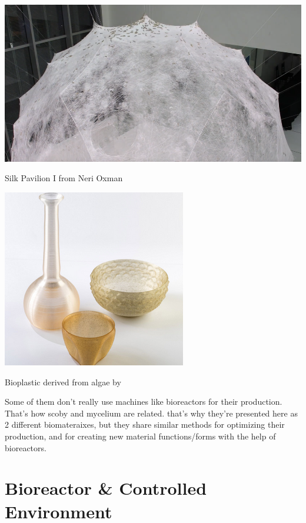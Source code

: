 \begin{marginfigure}
    \centering
    \includegraphics{images/Silk_Pavilion.png}    
    \caption{Silk Pavilion I from Neri Oxman}
    \label{fig:oxman}
\end{marginfigure}

\begin{marginfigure}
    \centering
    \includegraphics{images/ALGAE.png}    
    \caption{Bioplastic derived from algae by \cite{algaelab}}
    \label{fig:algae}
\end{marginfigure}

Some of them don't really use machines like bioreactors for their production.  
That's how scoby and mycelium are related. that's why they're presented here as 2 different biomateraixes, but they share similar methods for optimizing their production, and for creating new material functions/forms with the help of bioreactors. 



\section{Bioreactor \& Controlled Environment }




